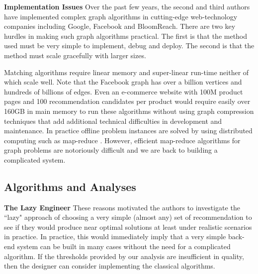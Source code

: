 {\bf Implementation Issues} Over the past few years, the second and
third authors have implemented complex graph algorithms in
cutting-edge web-technology companies including Google, Facebook and
BloomReach. There are two key hurdles in making such graph algorithms
practical. The first is that the method used must be very simple to
implement, debug and deploy. The second is that the method must scale
gracefully with larger sizes. \vs

Matching algorithms require linear memory and super-linear run-time
neither of which scale well. Note that the Facebook graph has over a
billion vertices\cite{FacebookNodes} and hundreds of billions of edges\cite{}. Even an
e-commerce website with 100M product pages and 100 recommendation candidates per
product would require easily over 160GB in main memory to run these
algorithms without using graph compression techniques that add additional technical difficulties
in development and maintenance. In practice offline problem instances are solved by using
distributed computing such as map-reduce \cite{DeanGhemawat2004}. 
However, efficient map-reduce algorithms for graph problems
are notoriously difficult and we are back to building a complicated
system. \vs


\subsection{Algorithms and Analyses}

{\bf The Lazy Engineer} These reasons motivated the authors to
investigate the ``lazy" approach of choosing a very simple (almost
any) set of recommendation to see if they would produce near optimal
solutions at least under realistic scenarios in practice.  In
practice, this would immediately imply that a very simple back-end
system can be built in many cases without the need for a complicated
algorithm. If the thresholds provided by our analysis are insufficient
in quality, then the designer can consider implementing the classical
algorithms. \vs

